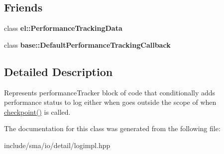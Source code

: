 \subsection*{Friends}
\begin{DoxyCompactItemize}
\item 
\hypertarget{classel_1_1base_1_1PerformanceTracker_a7a4da7334b79856c37538484584207a6}{class {\bfseries el\-::\-Performance\-Tracking\-Data}}\label{classel_1_1base_1_1PerformanceTracker_a7a4da7334b79856c37538484584207a6}

\item 
\hypertarget{classel_1_1base_1_1PerformanceTracker_ad346c4097e3db22a7434e7da5aa9c5e3}{class {\bfseries base\-::\-Default\-Performance\-Tracking\-Callback}}\label{classel_1_1base_1_1PerformanceTracker_ad346c4097e3db22a7434e7da5aa9c5e3}

\end{DoxyCompactItemize}


\subsection{Detailed Description}
Represents performance\-Tracker block of code that conditionally adds performance status to log either when goes outside the scope of when \hyperlink{classel_1_1base_1_1PerformanceTracker_aec9a6e149674c5782cc855e49aeb0aaf}{checkpoint()} is called. 

The documentation for this class was generated from the following file\-:\begin{DoxyCompactItemize}
\item 
include/sma/io/detail/logimpl.\-hpp\end{DoxyCompactItemize}
